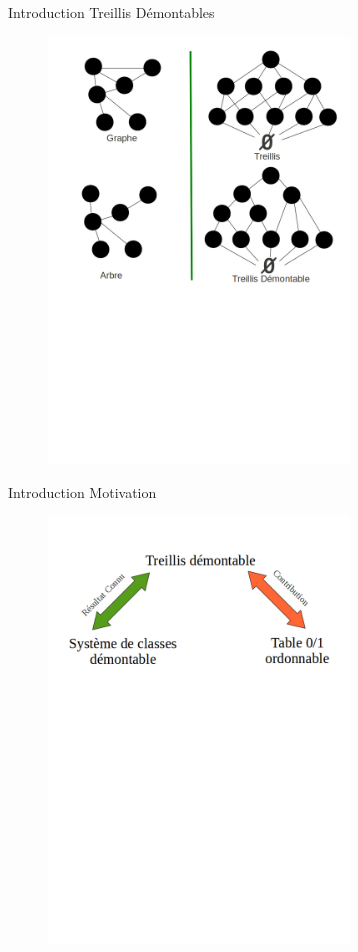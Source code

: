 \documentclass{beamer}
\begin{document}
  \begin{frame}{Introduction}
  \LARGE {\textrm{Treillis Démontables}}
   \begin{figure}
	\includegraphics[width=8cm]{images/memoire_figure4.png} 
    \end{figure}
  \end{frame}

  \begin{frame}{Introduction}
  \LARGE {\textrm{Motivation}}
   \begin{figure}
	\includegraphics[width=8cm]{images/memoire_figure6.png} 
    \end{figure}
  \end{frame}
\end{document}
